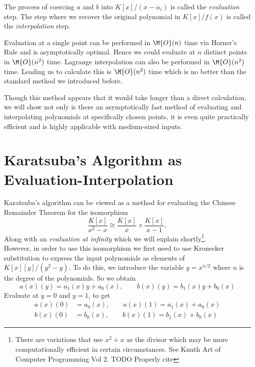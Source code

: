 The process of coercing $a$ and $b$ into $K[x]/ (x - \alpha_i)$ is called the \emph{evaluation} step. The step where we recover the original polynomial in $K[x]/f(x)$ is called the \emph{interpolation} step.

\medskip

Evaluation at a single point can be performed in $\M{O}(n)$ time via Horner's Rule and is asymptotically optimal. Hence we could evaluate at $n$ distinct points in $\M{O}(n^2)$ time. Lagrange interpolation can also be performed in $\M{O}(n^2)$ time. Leading us to calculate this is $\M{O}(n^2)$ time which is no better than the standard method we introduced before.

Though this method appears that it would take longer than a direct calculation, we will show not only is there an asymptotically fast method of evaluating and interpolating polynomials at specifically chosen points, it is even quite practically efficient and is highly applicable with medium-sized inputs.

\section{Karatsuba's Algorithm as Evaluation-Interpolation}%
\label{sec:Karatsuba's Algorithms as Evaluation-Interpolation}

Karatsuba's algorithm can be viewed as a method for evaluating the Chinese Remainder Theorem for the isomorphism
\[
    \frac{K[x]}{x^2 - x} \cong \frac{K[x]}{x} \times \frac{K[x]}{x-1},
\]
Along with an \emph{evaluation at infinity} which we will explain shortly\footnote{There are variations that use $x^2 + x$ as the divisor which may be more computationally efficient in certain circumstances. See Knuth Art of Computer Programming Vol 2. TODO Properly cite}.\\
However, in order to use this isomorphism we first need to use Kronecker substitution to express the input polynomials as elements of $K[x][y]/(y^2 - y)$. To do this, we introduce the variable $y = x^{n/2}$ where $n$ is the degree of the polynomials. So we obtain
\[
    a(x)(y) = a_1(x)y + a_0(x), \qquad b(x)(y) = b_1(x)y + b_0(x)
\]
Evaluate at $y = 0$ and $y = 1$, to get
\begin{align*}
    a(x)(0) &= a_0(x), \qquad a(x)(1) = a_1(x) + a_0(x)\\
    b(x)(0) &= b_0(x), \qquad b(x)(1) = b_1(x) + b_0(x)
\end{align*}

